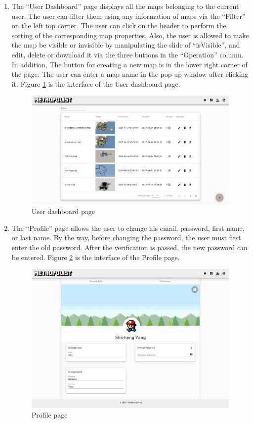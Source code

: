 \begin{enumerate}
  \item The ``User Dashboard'' page displays all the maps belonging to the current user. The user can filter them using any information of maps via the ``Filter'' on the left top corner. The user can click on the header to perform the sorting of the corresponding map properties. Also, the user is allowed to make the map be visible or invisible by manipulating the slide of ``isVisible'', and edit, delete or download it via the three buttons in the ``Operation'' column. In addition, The button for creating a new map is in the lower right corner of the page. The user can enter a map name in the pop-up window after clicking it. Figure \ref{fig:GUI user dashboard} is the interface of the User dashboard page.

  \begin{figure}[htbp]
    \includegraphics[width=\textwidth]{section04/assets/GUI-user.png}
    \caption{User dashboard page}
    \label{fig:GUI user dashboard}
  \end{figure}

  \item The ``Profile'' page allows the user to change his email, password, first name, or last name. By the way, before changing the password, the user must first enter the old password. After the verification is passed, the new password can be entered. Figure \ref{fig:GUI profile} is the interface of the Profile page.

  \begin{figure}[htbp]
    \includegraphics[width=\textwidth]{section04/assets/GUI-profile.png}
    \caption{Profile page}
    \label{fig:GUI profile}
  \end{figure}


\end{enumerate}
